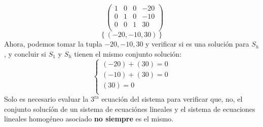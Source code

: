 \documentclass{article}
\begin{document}
\begin{enumerate}
\begin{enumerate}[label=\listAlph]
\[\begin{aligned}
                    \end{aligned}
                    \left(
                    \begin{array}{ccc|c}
                        1 & 0 & 0 & -20 \\
                        0 & 1 & 0 & -10 \\
                        0 & 0 & 1 & 30 \\
                    \end{array}
                    \right)
                \]
                \[
                    \left\{\left(-20, -10, 30\right)\right\}
                \]
                Ahora, podemos tomar la tupla \(-20, -10, 30\) y verificar si es una solución para \(S_h\), y concluir si \(S_1\) y \(S_h\) tienen el mismo conjunto solución:
                \[
                    \left\{
                        \begin{aligned}
                            \left(-20\right) + \left(30\right) = 0 \\
                            \left(-10\right) + \left(30\right) = 0 \\
                            \left(30\right) = 0 \\
                        \end{aligned}
                    \right.
                \]
                Solo es necesario evaluar la \(3^{\text{ra}}\) ecuación del sistema para verificar que, no, el conjunto solucíón de un sistema de ecuaciónes lineales 
                y el sistema de ecuaciones lineales homogéneo asociado \textbf{no siempre} es el mismo.


\end{enumerate}
\end{enumerate}
\end{document}
